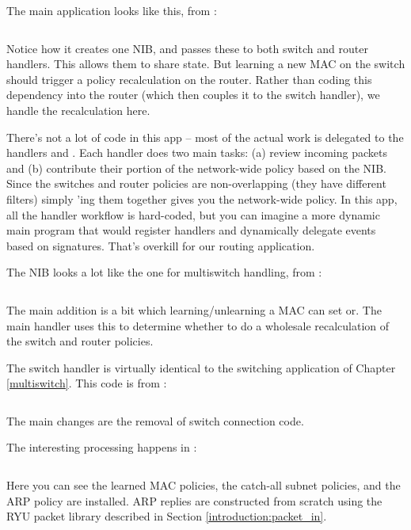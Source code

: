 The main application looks like this, from :

\inputminted{python}{code/routing/routing1.py}

Notice how it creates one NIB, and passes these to both switch and router handlers.  This allows
them to share state.  But learning a new MAC on the switch should trigger a policy recalculation on
the router.  Rather than coding this dependency into the router (which then couples it to the switch 
handler), we handle the recalculation here.  

There's not a lot of code in this app -- most of the actual work is delegated to the handlers
 and .  Each handler does two main tasks: (a) review
incoming packets and (b) contribute their portion of the network-wide policy based on the NIB.  
Since the switches and router policies are non-overlapping (they have different  filters)
simply 'ing them together gives you the network-wide policy.  
In this app, all the handler workflow is hard-coded, but you can imagine a more dynamic 
main program that would register handlers and dynamically delegate events based on signatures. 
That's overkill for our routing application.

The NIB looks a lot like the one for multiswitch handling, from :

\inputminted{python}{code/routing/network_information_base.py}  

The main addition is a  bit
which learning/unlearning a MAC can set or.  The main handler uses this to determine whether to do 
a wholesale recalculation of the switch and router policies.

The switch handler is virtually identical to the switching application of Chapter \ref{multiswitch}.  
This code is from :

\inputminted{python}{code/routing/switch_handler.py}

The main changes are the removal of switch connection code.

The interesting processing happens in :

\inputminted{python}{code/routing/router_handler.py}

Here you can see the learned MAC policies, the catch-all subnet policies, and the ARP policy are 
installed.  ARP replies are constructed from scratch using the RYU packet library described in
Section \ref{introduction:packet_in}.
